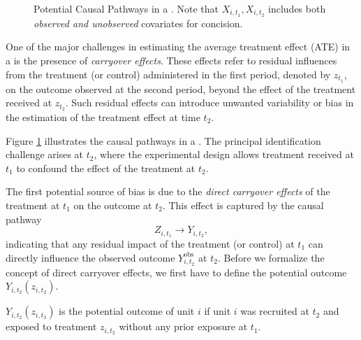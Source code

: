 \begin{figure}[h]
    \centering
    \caption{Potential Causal Pathways in a \Cwsd{}. Note that $X_{i,t_1}, X_{i,t_2}$ includes both \emph{observed and unobserved} covariates for concision.}
    \label{fig:CWSD_DAG}
\end{figure}

One of the major challenges in estimating the average treatment effect (ATE) in a \cwsd{} is the presence of \emph{carryover effects}. These effects refer to residual influences from the treatment (or control) administered in the first period, denoted by \(z_{t_1}\), on the outcome observed at the second period, beyond the effect of the treatment received at \(z_{t_2}\). Such residual effects can introduce unwanted variability or bias in the estimation of the treatment effect at time \(t_2\).

Figure \ref{fig:CWSD_DAG} illustrates the causal pathways in a \cwsd{}. The principal identification challenge arises at \(t_2\), where the experimental design allows treatment received at \(t_1\) to confound the effect of the treatment at \(t_2\).

The first potential source of bias is due to the \emph{direct carryover effects} of the treatment at \(t_1\) on the outcome at \(t_2\). This effect is captured by the causal pathway 
\[
Z_{i,t_1} \to Y_{i,t_2},
\]
indicating that any residual impact of the treatment (or control) at \(t_1\) can directly influence the observed outcome \(Y_{i,t_2}^{\text{obs}}\) at \(t_2\). Before we formalize the concept of direct carryover effects, we first have to define the potential outcome $Y_{i,t_2}(z_{i,t_2})$.

\begin{definition}
    $Y_{i,t_2}(z_{i,t_2})$ is the potential outcome of unit $i$ if unit $i$ was recruited at $t_2$ and exposed to treatment $z_{i,t_2}$ without any prior exposure at $t_1$.
\end{definition}

